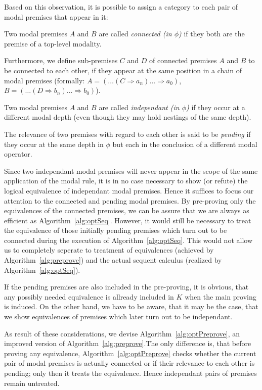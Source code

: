 \documentclass{entcs} \usepackage{entcsmacro}
\begin{document}
Based on this observation, it is possible to assign a category to each pair of
modal premises that appear in it:

\begin{definition}
Two modal premises $A$ and $B$ are called \emph{connected (in $\phi$)} if
they both are the premise of a top-level modality.

Furthermore, we define sub-premises $C$ and $D$ of connected premises $A$ and $B$
to be connected to each other, if they appear at the same position in a chain
of modal premises (formally: $A=(\ldots(C\Rightarrow a_n)\ldots \Rightarrow a_0)$,
$B=(\ldots(D\Rightarrow b_n)\ldots \Rightarrow b_0)$).

Two modal premises $A$ and $B$ are called \emph{independant (in $\phi$)} if
they occur at a different modal depth (even though they may
hold nestings of the same depth).

The relevance of two premises with regard to each other is said to be
\emph{pending} if they occur at the same depth in $\phi$ but each
in the conclusion of a different modal operator.
\end{definition}

Since two independant modal premises will never appear in the scope of the
same application of the modal rule, it is in no case necessary to show (or
refute) the logical equivalence of independant
modal premises. Hence it suffices to focus
our attention to the connected and pending modal premises. By pre-proving only
the equivalences of the connected premises, we can be assure that we are 
always as efficient as Algorithm~\ref{alg:optSeq}. However, it would still
be necessary to treat the equivalence of those initially pending premises which
turn out to be connected during the execution of Algorithm~\ref{alg:optSeq}.
This would not allow us to completely seperate to treatment of equivalences
(achieved by Algorithm~\ref{alg:preprove}) and the actual sequent calculus (realized by
Algorithm~\ref{alg:optSeq}).

If the pending premises are also included in the pre-proving, it is obvious, that
any possibly needed equivalence is allready included in $K$ when the main proving
is induced. On the other hand, we have to be aware, that it may be the case, that
we show equivalences of premises which later turn out to be independant.

As result of these considerations, we devise Algorithm~\ref{alg:optPreprove},
an improved version of Algorithm~\ref{alg:preprove}.The only difference is,
that before proving any equivalence, Algorithm~\ref{alg:optPreprove} checks
whether the current pair of modal premises is actually connected or if their
relevance to each other is pending; only then it treats the equivalence. Hence
independant pairs of premises remain untreated.
\end{document}
